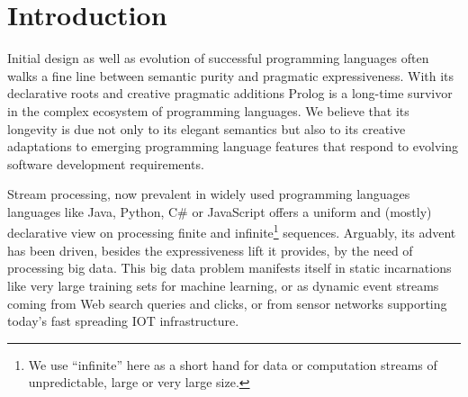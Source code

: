 \documentclass{new_tlp}
\begin{document}
\begin{comment}
\begin{abstract}
Lazy stream generators provide a unified interface to stateful computations, I/O operations as well as algorithms producing finite or infinite sequences. 

As a special instance, we introduce answer stream generators that 
encapsulate the work of coroutining first-class logic engines and support interoperation between forward recursive {\em AND-streams} and backtracking-generated {\em OR-streams}. 

Stream generators are exposed to the application programmer either through an abstract sequence manipulation API or as lazy lists. We define an algebra of stream generator operations that extends Prolog via an embedded language interpreter providing a compact notation for composition mechanisms and supports moving between isomorphic sequence representations.
\end{abstract}
\end{comment}


\section{Introduction}

Initial design as well as evolution of successful programming languages often walks a fine line between semantic purity and pragmatic expressiveness. With its declarative roots and creative pragmatic additions Prolog is a long-time survivor in the complex ecosystem of programming languages. We believe that its longevity is due not only to its elegant semantics but also to its creative adaptations to emerging programming language features that respond to evolving software development requirements.

Stream processing, now prevalent in widely used programming languages languages like Java, Python, C\# or JavaScript offers a uniform and (mostly) declarative view on processing finite 
and infinite\footnote{We use ``infinite'' here as a short hand  for data or computation streams of unpredictable, large or very large size.} sequences. Arguably, its advent has been driven, besides the expressiveness lift it provides, by the need of processing big data. This big data problem manifests itself in static incarnations like very large training sets for machine learning, or as dynamic event streams coming from Web search queries and clicks,  or from sensor networks supporting today's fast spreading IOT infrastructure.
 
\end{document}
